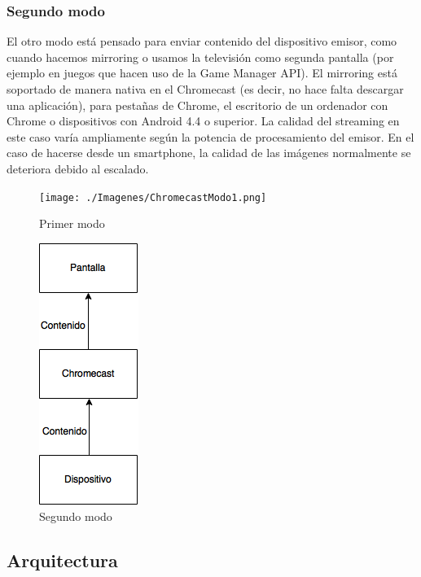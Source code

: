 \subsubsection{Segundo modo}
El otro modo está pensado para enviar contenido del dispositivo emisor, como cuando hacemos mirroring o usamos la televisión como segunda pantalla (por ejemplo en juegos que hacen uso de la Game Manager API).
El mirroring está soportado de manera nativa en el Chromecast (es decir, no hace falta descargar una aplicación), para pestañas de Chrome, el escritorio de un ordenador con Chrome o dispositivos con Android 4.4 o superior.
La calidad del streaming en este caso varía ampliamente según la potencia de procesamiento del emisor.
En el caso de hacerse desde un smartphone, la calidad de las imágenes normalmente se deteriora debido al escalado.



\begin{figure}[h]
	\centering
	\begin{minipage}[b]{.35\textwidth}
		\centering
		\texttt{[image: ./Imagenes/ChromecastModo1.png]}
		\caption{Primer modo}\label{fig:modo1}
	\end{minipage}\qquad
	\hspace{1.5cm}
	\begin{minipage}[b]{.35\textwidth}
		\centering
		\includegraphics[scale=0.6]{./Imagenes/ChromecastModo2.png}
		\caption{Segundo modo}\label{fig:modo2}
	\end{minipage}
\end{figure}


\subsection{Arquitectura}

